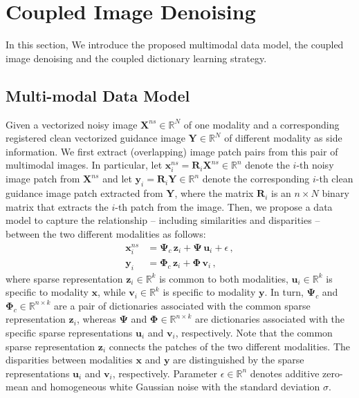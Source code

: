 \documentclass{article}
\begin{document}
\section{Coupled Image Denoising}
\label{sec:SIMIS}

\vspace{-0.2cm}

In this section, We introduce the proposed multimodal data model, the coupled image denoising and the coupled dictionary learning strategy.


\vspace{-0.2cm}

\subsection{Multi-modal Data Model}


Given a vectorized noisy image $\mathbf{X}^{ns} \in \mathbb{R}^{N}$ of one modality and a corresponding registered clean vectorized guidance image $\mathbf{Y} \in \mathbb{R}^{N}$ of different modality as side information. We first extract (overlapping) image patch pairs from this pair of multimodal images. In particular, let $\mathbf{x}^{ns}_{i} = \mathbf{R}_i \mathbf{X}^{ns} \in \mathbb{R}^{n}$ denote the $i$-th noisy image patch from $\mathbf{X}^{ns}$ and let $\mathbf{y}_{i} = \mathbf{R}_i \mathbf{Y} \in \mathbb{R}^{n}$ denote the corresponding $i$-th clean guidance image patch extracted from $\mathbf{Y}$, where the matrix $\mathbf{R}_i$ is an $n \times N$ binary matrix that extracts the $i$-th patch from the image. Then, we propose a data model to capture the relationship -- including similarities and disparities -- between the two different modalities as follows:
\begin{align}
\mathbf{x}^{ns}_i 
&= 
\boldsymbol{\Psi}_{c} \, \mathbf{z}_i + \boldsymbol{\Psi} \, \mathbf{u}_i + \epsilon \,,
\label{Eq:SparseModelX_Noise}
\\
\mathbf{y}_i
&= 
\boldsymbol{\Phi}_{c} \, \mathbf{z}_i + \boldsymbol{\Phi} \, \mathbf{v}_i \,,
\label{Eq:SparseModelY_Noise}
\end{align}
where sparse representation $\mathbf{z}_i \in \mathbb{R}^{k}$ is common to both modalities, $\mathbf{u}_i \in \mathbb{R}^{k}$ is specific to modality $\mathbf{x}$, while $\mathbf{v}_i \in \mathbb{R}^{k}$ is specific to modality $\mathbf{y}$. In turn, $\boldsymbol{\Psi}_{c} $ and $\boldsymbol{\Phi}_{c} \in \mathbb{R}^{n \times k}$ are a pair of dictionaries associated with the common sparse representation $\mathbf{z}_i$, whereas $\boldsymbol{\Psi}$ and $\boldsymbol{\Phi} \in \mathbb{R}^{n \times k}$ are dictionaries associated with the specific sparse representations $\mathbf{u}_i$ and $\mathbf{v}_i$, respectively. 
Note that the common sparse representation $\mathbf{z}_i$ connects the patches of the two different modalities. The disparities between modalities $\mathbf{x}$ and $\mathbf{y}$ are distinguished by the sparse representations $\mathbf{u}_i$ and $\mathbf{v}_i$, respectively. 
Parameter $\epsilon \in \mathbb{R}^n$ denotes additive zero-mean and homogeneous white Gaussian noise with the standard deviation $\sigma$.
\end{document}
